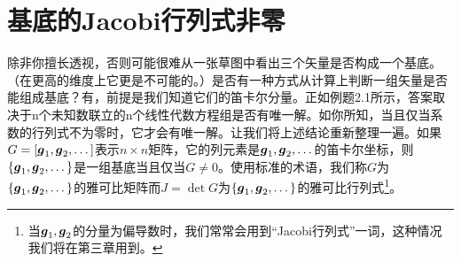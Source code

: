 \section{基底的Jacobi行列式非零}

除非你擅长透视，否则可能很难从一张草图中看出三个矢量是否构成一个基底。（在更高的维度上它更是不可能的。）是否有一种方式从计算上判断一组矢量是否能组成基底？有，前提是我们知道它们的笛卡尔分量。正如例题2.1所示，答案取决于n个未知数联立的n个线性代数方程组是否有唯一解。如你所知，当且仅当系数的行列式不为零时，它才会有唯一解。让我们将上述结论重新整理一遍。如果$G=\left[ \boldsymbol{g}_1,\boldsymbol{g}_2,\dots \right] $表示$n\times n$矩阵，它的列元素是$\boldsymbol{g}_1,\boldsymbol{g}_2,\dots$的笛卡尔坐标，则$\left\{ \boldsymbol{g}_1,\boldsymbol{g}_2,\dots \right\} $是一组基底当且仅当$G\ne 0$。使用标准的术语，我们称$ G $为$\left\{ \boldsymbol{g}_1,\boldsymbol{g}_2,\dots \right\} $的雅可比矩阵而$J=\det G$为$\left\{ \boldsymbol{g}_1,\boldsymbol{g}_2,\dots \right\} $的雅可比行列式\footnote{当$\boldsymbol{g}_1,\boldsymbol{g}_2$的分量为偏导数时，我们常常会用到“Jacobi行列式”一词，这种情况我们将在第三章用到。}。